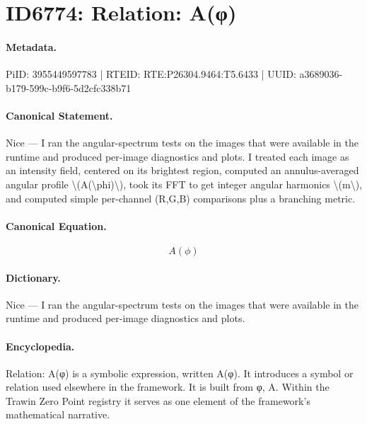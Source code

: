 \section*{ID6774: Relation: A(φ)}
\paragraph{Metadata.}
PiID: 3955449597783 | RTEID: RTE:P26304.9464:T5.6433 | UUID: a3689036-b179-599c-b9f6-5d2cfc338b71

\paragraph{Canonical Statement.}
Nice — I ran the angular-spectrum tests on the images that were available in the runtime and produced per-image diagnostics and plots. I treated each image as an intensity field, centered on its brightest region, computed an annulus-averaged angular profile \textbackslash{}(A(\textbackslash{}phi)\textbackslash{}), took its FFT to get integer angular harmonics \textbackslash{}(m\textbackslash{}), and computed simple per-channel (R,G,B) comparisons plus a branching metric.

\paragraph{Canonical Equation.}
\[
A(\phi)
\]

\paragraph{Dictionary.}
Nice — I ran the angular-spectrum tests on the images that were available in the runtime and produced per-image diagnostics and plots.

\paragraph{Encyclopedia.}
Relation: A(φ) is a symbolic expression, written A(φ). It introduces a symbol or relation used elsewhere in the framework. It is built from φ, A. Within the Trawin Zero Point registry it serves as one element of the framework's mathematical narrative.
